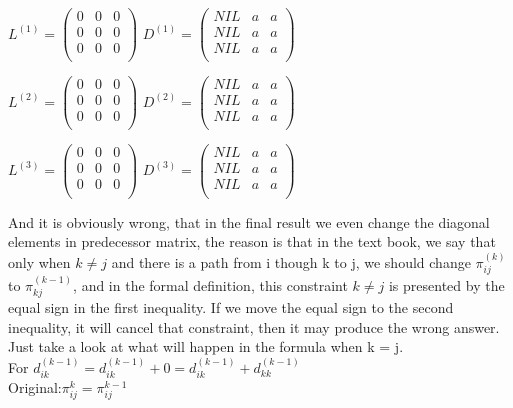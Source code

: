 \documentclass[oneside]{homework} %
\begin{document}
\begin{multicols}{2}
$
L^{(1)} =
 \begin{pmatrix}
   0 & 0 & 0\\
   0 & 0 & 0\\
   0 & 0 & 0\\
 \end{pmatrix}
$
\columnbreak
$
D^{(1)} =
 \begin{pmatrix}
   NIL & a & a \\
   NIL & a & a \\
   NIL & a & a \\
 \end{pmatrix}
$
\end{multicols}
\begin{multicols}{2}
$
L^{(2)} =
 \begin{pmatrix}
   0 & 0 & 0\\
   0 & 0 & 0\\
   0 & 0 & 0\\
 \end{pmatrix}
$
\columnbreak
$
D^{(2)} =
 \begin{pmatrix}
   NIL & a & a \\
   NIL & a & a \\
   NIL & a & a \\
 \end{pmatrix}
$
\end{multicols}
\begin{multicols}{2}
$
L^{(3)} =
 \begin{pmatrix}
   0 & 0 & 0\\
   0 & 0 & 0\\
   0 & 0 & 0\\
 \end{pmatrix}
$
\columnbreak
$
D^{(3)} =
 \begin{pmatrix}
   NIL & a & a \\
   NIL & a & a \\
   NIL & a & a \\
 \end{pmatrix}
$
\end{multicols}

And it is obviously wrong, that in the final result we even change the diagonal elements in predecessor matrix, the reason is that in the text book, we say that only when $k \neq j$ and there is a path from i though k to j, we should change $\pi_{ij}^{(k)}$ to $\pi_{kj}^{(k-1)}$, and in the formal definition, this constraint $k \neq j$ is presented by the equal sign in the first inequality.
If we move the equal sign to the second inequality, it will cancel that constraint, then it may produce the wrong answer.  
Just take a look at what will happen in the formula when k = j.
\\For $d_{ik}^{(k-1)} = d_{ik}^{(k-1)} + 0 = d_{ik}^{(k-1)} + d_{kk}^{(k-1)} $ \\
Original:$\pi_{ij}^{k} = \pi_{ij}^{k-1}$
\end{document}
